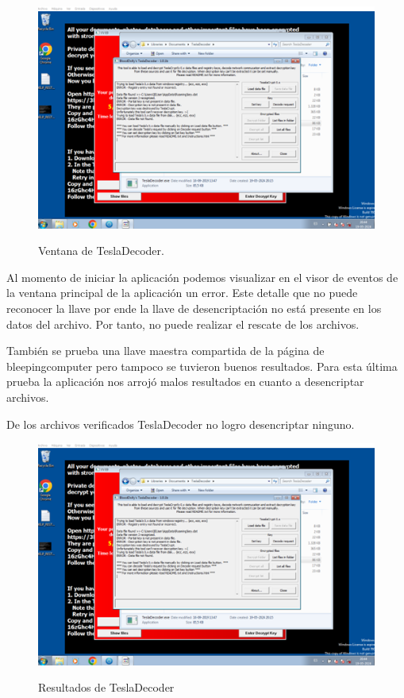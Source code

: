 \documentclass[stu, 11pt, letterpaper, donotrepeattitle, floatsintext, natbib]{apa7}
\begin{document}
\begin{figure}[H]
    \centering
    \caption{Ventana de TeslaDecoder.}
    \includegraphics[width=0.75\linewidth]{ram12.png} %
    \label{fig:OverallEffect}
\end{figure}

Al momento de iniciar la aplicación podemos visualizar en el visor de eventos de la ventana principal de la aplicación un error. Este detalle que no puede reconocer la llave por ende la llave de desencriptación no está presente en los datos del archivo. Por tanto, no puede realizar el rescate de los archivos.

También se prueba una llave maestra compartida de la página de bleepingcomputer  \citep{blogteslacrypt} pero tampoco se tuvieron buenos resultados.
Para esta última prueba la aplicación nos arrojó malos resultados en cuanto a desencriptar archivos.

De los archivos verificados TeslaDecoder no logro desencriptar ninguno. 

\begin{figure}[H]
    \centering
    \caption{Resultados de TeslaDecoder}
    \includegraphics[width=0.75\linewidth]{ram12.png} %
    \label{fig:OverallEffect}
\end{figure}
\end{document}
